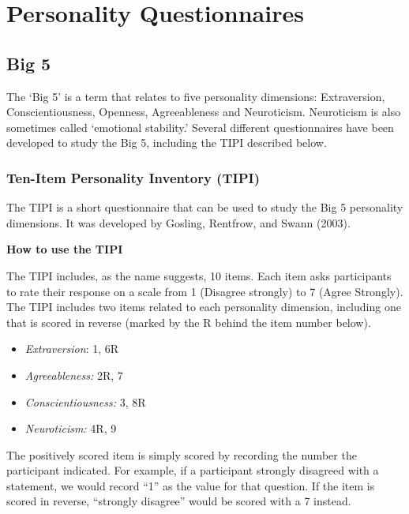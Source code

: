 \documentclass[
]{book}
\providecommand{\tightlist}{%
  \setlength{\itemsep}{0pt}\setlength{\parskip}{0pt}}
\begin{document}
\hypertarget{personality-questionnaires}{%
\chapter{Personality Questionnaires}\label{personality-questionnaires}}

\hypertarget{big-5}{%
\section{Big 5}\label{big-5}}

The `Big 5' is a term that relates to five personality dimensions: Extraversion,
Conscientiousness, Openness, Agreeableness and Neuroticism. Neuroticism is also sometimes called `emotional stability.' Several different questionnaires have been developed to study the Big 5, including the TIPI described below.

\hypertarget{ten-item-personality-inventory-tipi}{%
\subsection{Ten-Item Personality Inventory (TIPI)}\label{ten-item-personality-inventory-tipi}}

The TIPI is a short questionnaire that can be used to study the Big 5 personality dimensions. It was developed by Gosling, Rentfrow, and Swann (2003).

\textbf{How to use the TIPI}

The TIPI includes, as the name suggests, 10 items. Each item asks participants to rate their response on a scale from 1 (Disagree strongly) to 7 (Agree Strongly). The TIPI includes two items related to each personality dimension, including one that is scored in reverse (marked by the R behind the item number below).

\begin{itemize}
\tightlist
\item
  \emph{Extraversion}: 1, 6R
\item
  \emph{Agreeableness:} 2R, 7
\item
  \emph{Conscientiousness:} 3, 8R
\item
  \emph{Neuroticism:} 4R, 9
\end{itemize}

The positively scored item is simply scored by recording the number the participant indicated. For example, if a participant strongly disagreed with a statement, we would record ``1'' as the value for that question. If the item is scored in reverse, ``strongly disagree'' would be scored with a 7 instead.
\end{document}
